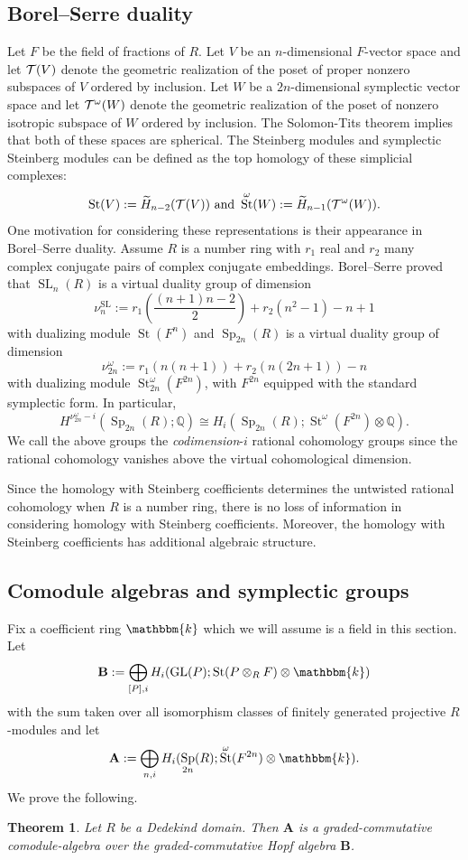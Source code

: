 \documentclass[11pt,letterpaper]{amsart}
\newcommand{\bk}{\mathbbm{k}}
\DeclareMathOperator{\Sp}{Sp}
\newcommand{\HH}{\mathbf{B}}
\newcommand{\HA}{\mathbf{A}}
\newcommand{\Q}{\mathbb{Q}}
\numberwithin{theoremcounter}{section}
\newtheorem{theorem}[theoremauto]{Theorem}
\theoremstyle{definition}
\theoremstyle{remark}
\DeclareMathOperator{\GL}{GL}
\DeclareMathOperator{\SL}{SL}
\DeclareMathOperator{\St}{St}
\begin{document}
\subsection{Borel--Serre duality}
Let $F$ be the field of fractions of $R$. Let $V$ be an $n$-dimensional $F$-vector space and let $\mathcal{T}(V)$ denote the geometric realization of the poset of proper nonzero subspaces of $V$ ordered by inclusion. Let $W$ be a $2n$-dimensional symplectic vector space and let $\mathcal{T}^\omega(W)$ denote the geometric realization of the poset of nonzero isotropic subspace of $W$ ordered by inclusion. The Solomon-Tits theorem implies that both of these spaces are spherical. The Steinberg modules and symplectic Steinberg modules can be defined as the top homology of these simplicial complexes:  $$\St(V) : = \widetilde H_{n-2}(\cT(V)) \text{ and } \St^\omega(W) : = \widetilde H_{n-1}(\cT^\omega(W)).$$ One motivation for considering these representations is their appearance in Borel--Serre duality. Assume $R$ is a number ring with $r_1$ real and $r_2$ many complex conjugate pairs of complex conjugate embeddings. Borel--Serre proved that $\SL_n(R)$ is a virtual duality group of dimension $$\nu^{\SL}_n:= r_1\left(\frac{(n+1)n-2}{2}\right) + r_2(n^2-1) - n + 1 $$ with dualizing module $\St(F^n)$ and  
$\Sp_{2n}(R)$ is a virtual duality group of dimension $$\nu^\omega_{2n}:= r_1 (n(n+1))+r_2(n(2n+1))-n$$ with dualizing module $\St^\omega_{2n}(F^{2n})$, with $F^{2n}$ equipped with the standard symplectic form. 
In particular, $$H^{\nu_{2n}^\omega-i}(\Sp_{2n}(R) ;\Q) \cong H_i(\Sp_{2n}(R) ;\St^\omega(F^{2n}) \otimes \Q).  $$
We call the above groups the \emph{codimension}-$i$ rational cohomology groups since the rational cohomology vanishes above the virtual cohomological dimension. 

Since the homology with Steinberg coefficients determines the untwisted rational cohomology when $R$ is a number ring, there is no loss of information in considering homology with Steinberg coefficients. Moreover, the homology with Steinberg coefficients has additional algebraic structure.


\subsection{Comodule algebras and symplectic groups}
Fix a coefficient ring $\bk$ which we will assume is a field in this section.
Let $$\HH :=\bigoplus_{[P],i} H_i(\GL(P);\St(P \otimes_R F) \otimes \bk)$$ with the sum taken over all isomorphism classes of finitely generated projective $R$-modules and let $$\HA :=\bigoplus_{n,i } H_i(\Sp_{2n}(R);\St^\omega(F^{2n})\otimes \bk).$$ We prove the following.
\begin{theorem}\label{main} Let $R$ be a Dedekind domain. Then $\HA$ is a graded-commutative comodule-algebra over the graded-commutative Hopf algebra $\HH$.
\end{theorem}
\end{document}
